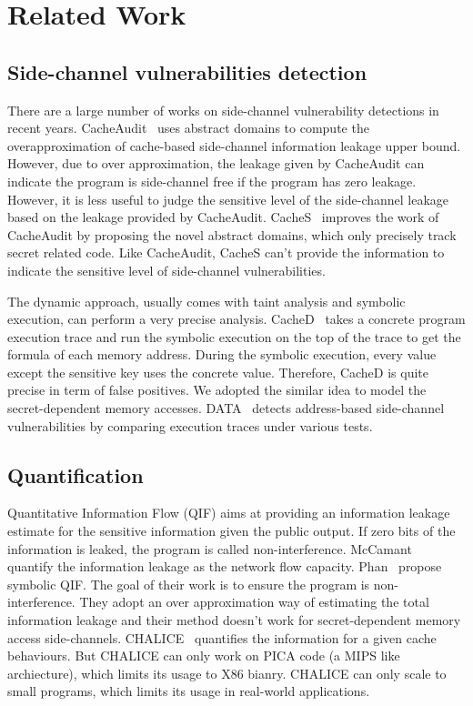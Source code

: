 \section{Related Work}
\subsection{Side-channel vulnerabilities detection}

There are a large number of works on side-channel vulnerability detections in recent years.
CacheAudit~\cite{182946} uses abstract domains to compute the overapproximation of cache-based
side-channel information leakage upper bound. However, due to over approximation, the leakage
given by CacheAudit can indicate the program is side-channel free if the program has zero leakage. 
However, it is less useful to judge the sensitive level of the side-channel leakage based on the
leakage provided by CacheAudit. CacheS~\cite{236338} improves the work of CacheAudit by proposing 
the novel abstract domains, which only precisely track secret related code. Like CacheAudit, CacheS
can't provide the information to indicate the sensitive level of side-channel vulnerabilities.

The dynamic approach, usually comes with taint analysis and symbolic execution, can perform a very 
precise analysis. CacheD~\cite{203878} takes a concrete program execution trace and run the symbolic
execution on the top of the trace to get the formula of each memory address. During the symbolic
execution, every value except the sensitive key uses the concrete value. Therefore, CacheD is quite 
precise in term of false positives. We adopted the similar idea to model the  secret-dependent memory 
accesses.  DATA~\cite{217537} detects address-based side-channel vulnerabilities by comparing 
execution traces under various tests. 

\subsection{Quantification}
Quantitative Information Flow (QIF) aims at providing an information leakage estimate for the
sensitive information given the public output. If zero bits of the information is leaked, the 
program is called non-interference. McCamant~\cite{McCamantE2008} quantify the information leakage
as the network flow capacity. Phan~\cite{Phan:2012:SQI:2382756.2382791} propose symbolic QIF. The
goal of their work is to ensure the program is non-interference. They adopt an over
approximation way of estimating the total information leakage and their method doesn't work for
secret-dependent memory access side-channels. CHALICE~\cite{Chattopadhyay:2017:QIL:3127041.3127044}
quantifies the information for a given cache behaviours. But CHALICE can only 
work on PICA code (a MIPS like archiecture), which limits its usage to X86 bianry. 
CHALICE can only scale to small programs, which limits its usage in
real-world applications.



